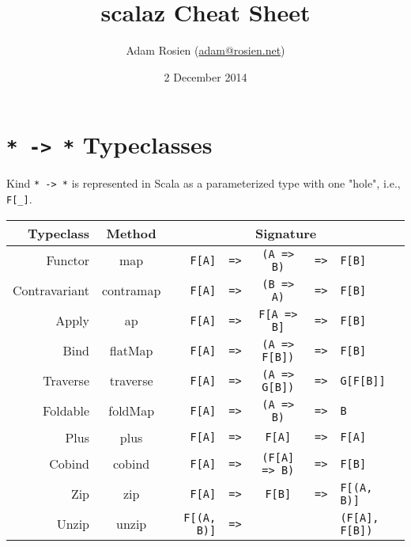 \documentclass{tufte-handout}
\title{scalaz Cheat Sheet}
\author[Adam Rosien]{Adam Rosien (\href{mailto:adam@rosien.net}{adam@rosien.net})}
\date{2 December 2014}  %
\newcommand{\fa}{F[A]}
\newcommand{\fb}{F[B]}
\newcommand{\rarr}{\texttt{=>}}
\newcommand{\fTwo}[2]{\texttt{#1} & \rarr & & & \texttt{#2}}
\newcommand{\fThree}[3]{\texttt{#1} & \rarr & \texttt{#2} & \rarr & \texttt{#3}}
\begin{document}
\maketitle%


\section{\texttt{* -> *} Typeclasses}\label{sec:sigs}

Kind \texttt{* -> *} is represented in Scala as a parameterized type with one "hole", i.e., \texttt{F[\_]}.

\begin{table}[ht]
  \centering
  \selectfont
  \begin{tabular}{rcrlccl}
    Typeclass & Method & \multicolumn{5}{c}{Signature} \\
    \midrule
    Functor       & map & \fThree{\fa}{(A => B)}{\fb} \\
    Contravariant & contramap & \fThree{\fa}{(B => A)}{\fb} \\
    Apply         & ap & \fThree{\fa}{F[A => B]}{\fb} \\
    Bind          & flatMap & \fThree{\fa}{(A => F[B])}{\fb} \\
    Traverse      & traverse & \fThree{\fa}{(A => G[B])}{G[F[B]]} \\
    Foldable      & foldMap & \fThree{\fa}{(A => B)}{B} \\
    Plus          & plus & \fThree{\fa}{\fa}{\fa} \\
    Cobind        & cobind & \fThree{\fa}{(F[A] => B)}{\fb} \\
    Zip           & zip & \fThree{\fa}{\fb}{F[(A, B)]} \\
    Unzip         & unzip & \fTwo{F[(A, B)]}{(F[A], F[B])} \\
  \end{tabular}
  \label{tab:normaltab}
\end{table}
\end{document}
